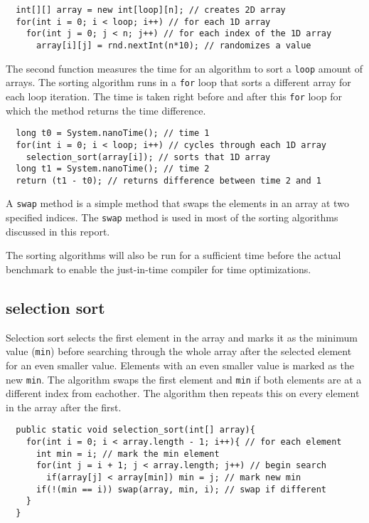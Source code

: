 \documentclass[a4paper,11pt]{article}
\begin{document}
\begin{verbatim}
  int[][] array = new int[loop][n]; // creates 2D array
  for(int i = 0; i < loop; i++) // for each 1D array
    for(int j = 0; j < n; j++) // for each index of the 1D array
      array[i][j] = rnd.nextInt(n*10); // randomizes a value 
\end{verbatim}

The second function measures the time for an algorithm to sort a
{\tt loop} amount of arrays. The sorting algorithm runs in a {\tt for} 
loop that sorts a different array for each loop iteration. The 
time is taken right before and after this {\tt for} loop for which the
method returns the time difference. 

\begin{verbatim}
  long t0 = System.nanoTime(); // time 1
  for(int i = 0; i < loop; i++) // cycles through each 1D array
    selection_sort(array[i]); // sorts that 1D array
  long t1 = System.nanoTime(); // time 2
  return (t1 - t0); // returns difference between time 2 and 1
\end{verbatim}

A {\tt swap} method is a simple method that swaps the elements in an 
array at two specified indices. The {\tt swap} method is used in most of 
the sorting algorithms discussed in this report.

The sorting algorithms will also be run for a sufficient time before the 
actual benchmark to enable the just-in-time compiler for time 
optimizations.

\subsection*{selection sort}

Selection sort selects the first element in the array and marks it as the 
minimum value ({\tt min}) before searching through the whole array after 
the selected element for an even smaller value. Elements with an even 
smaller value is marked as the new {\tt min}. The algorithm swaps the 
first element and {\tt min} if both elements are at a different index 
from eachother. The algorithm then repeats this on every element in the 
array after the first.

\begin{verbatim}
  public static void selection_sort(int[] array){
    for(int i = 0; i < array.length - 1; i++){ // for each element
      int min = i; // mark the min element
      for(int j = i + 1; j < array.length; j++) // begin search
        if(array[j] < array[min]) min = j; // mark new min
      if(!(min == i)) swap(array, min, i); // swap if different
    }
  }
\end{verbatim}
\end{document}
